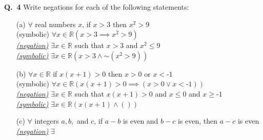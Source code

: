 \documentclass[a4paper,12pt]{article}
\newcommand*{\ltnot}{\mathord{\sim}}
\newcommand{\sz}{\text{-}}
\begin{document}
\noindent \textbf{Q.~4} Write negations for each of the following statements:
\begin{itemize}
    \item[(a)] $\forall$ real numbers $x$, if $x > 3$ then $x^2 > 9$\\
    (symbolic) $\forall x \in \mathbb{R} (x>3 \implies x^2 > 9)$ \\
    \textsl{\ul{(negation)}} $\exists x \in \mathbb{R}$ such that $x>3$ and $x^2 \leq 9$ \\
    \textsl{\ul{(symbolic)}} $\exists x \in \mathbb{R} (x>3 \land \ltnot (x^2 > 9))$

    \item[(b)] $\forall x \in \mathbb{R}$ if $x(x+1) > 0$ then $x>0$ or $x<\sz1$\\
    (symbolic) $\forall x \in \mathbb{R} ( x(x+1) > 0 \implies (x>0 \lor x< \sz 1))$\\ 
    \textsl{\ul{(negation)}} $\exists x \in \mathbb{R}$ such that $x(x+1)>0$ and $x \leq 0$ and $x \ge \sz1$\\
    \textsl{\ul{(symbolic)}} $\exists x \in \mathbb{R} (x(x+1) \land ())$
    \item[(c)] $\forall$ integers $a, b,$ and $c$, if $a-b$ is even and $b-c$ is even, then $a-c$ is even\\
    \textsl{\ul{(negation)}} $\exists $
\end{itemize}
\end{document}
